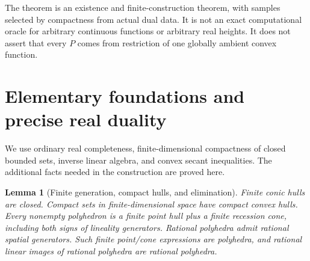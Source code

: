 \documentclass[11pt]{article}
\newtheorem{lemma}[theorem]{Lemma}
\begin{document}
The theorem is an existence and finite-construction theorem, with samples selected by compactness from actual dual data. It is not an exact computational oracle for arbitrary continuous functions or arbitrary real heights. It does not assert that every $P$ comes from restriction of one globally ambient convex function.

\section{Elementary foundations and precise real duality}
We use ordinary real completeness, finite-dimensional compactness of closed bounded sets, inverse linear algebra, and convex secant inequalities. The additional facts needed in the construction are proved here.

\begin{lemma}[Finite generation, compact hulls, and elimination]\label{lem:finite}
Finite conic hulls are closed. Compact sets in finite-dimensional space have compact convex hulls. Every nonempty polyhedron is a finite point hull plus a finite recession cone, including both signs of lineality generators. Rational polyhedra admit rational spatial generators. Such finite point/cone expressions are polyhedra, and rational linear images of rational polyhedra are rational polyhedra.
\end{lemma}
\end{document}
